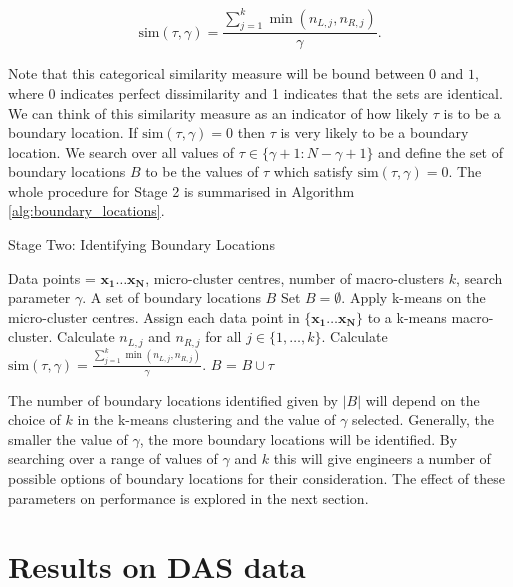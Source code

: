 \begin{equation}
  \label{eq:sim_cont_tab}
  \text{sim}(\tau, \gamma) = \frac{\sum_{j = 1}^{k} \min (n_{L,j}, n_{R,j})}{\gamma}.
\end{equation}
 
Note that this categorical similarity measure will be bound between $0$ and $1$, where 0 indicates perfect dissimilarity and 1 indicates that the sets are identical.  We can think of this similarity measure as an indicator of how likely $\tau$ is to be a boundary location. If $\text{sim}(\tau, \gamma) = 0$ then $\tau$ is very likely to be a boundary location. We search over all values of $\tau \in \{\gamma+1 :  N-\gamma+1\}$ and define the set of boundary locations $B$ to be the values of $\tau$ which satisfy $\text{sim}(\tau, \gamma) = 0 $. The whole procedure for Stage 2 is summarised in Algorithm \ref{alg:boundary_locations}. 

\begin{algorithm}
\caption{Stage Two: Identifying Boundary Locations}  
\begin{algorithmic}[1]
\REQUIRE Data points =  $\boldsymbol{x_1} \ldots \boldsymbol{x_N}$, micro-cluster centres, number of macro-clusters $k$, search parameter $\gamma$.
\ENSURE A set of boundary locations $B$
\STATE Set $B = \emptyset$. 
\STATE Apply k-means on the micro-cluster centres.
\STATE Assign each data point in  $\{\boldsymbol{x_1} \ldots \boldsymbol{x_N}\}$ to a k-means macro-cluster.
\STATE Calculate $n_{L,j}$ and $n_{R,j}$ for all $j \in \{1, \ldots, k\}$. 
\STATE Calculate $\text{sim}(\tau, \gamma) = \frac{\sum_{j = 1}^{k} \min (n_{L,j}, n_{R,j})}{\gamma}$. 
   \STATE $B$ = $B \cup \tau$ 
  \ENDIF
\ENDFOR
\end{algorithmic}
\label{alg:boundary_locations}
\end{algorithm}

The number of boundary locations  identified  given by $|B|$  will depend on the choice of $k$ in the k-means clustering and the value of $\gamma$ selected. Generally, the smaller the value of $\gamma$, the more boundary locations will be identified. By searching over a range of values of $\gamma$ and $k$ this will give engineers a number of possible options of boundary locations for their consideration. The effect of these parameters on performance is explored in the next section. 

\newpage
\section{Results on DAS data}
\label{sec:das_analysis}

